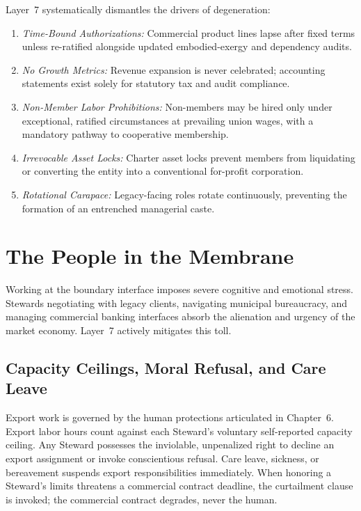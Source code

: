 Layer~7 systematically dismantles the drivers of degeneration:
\begin{enumerate}
  \item \textit{Time-Bound Authorizations:} Commercial product lines lapse after fixed terms unless re-ratified alongside updated embodied-exergy and dependency audits.
  \item \textit{No Growth Metrics:} Revenue expansion is never celebrated; accounting statements exist solely for statutory tax and audit compliance.
  \item \textit{Non-Member Labor Prohibitions:} Non-members may be hired only under exceptional, ratified circumstances at prevailing union wages, with a mandatory pathway to cooperative membership.
  \item \textit{Irrevocable Asset Locks:} Charter asset locks prevent members from liquidating or converting the entity into a conventional for-profit corporation.
  \item \textit{Rotational Carapace:} Legacy-facing roles rotate continuously, preventing the formation of an entrenched managerial caste.
\end{enumerate}

\section{The People in the Membrane}

Working at the boundary interface imposes severe cognitive and emotional stress. Stewards negotiating with legacy clients, navigating municipal bureaucracy, and managing commercial banking interfaces absorb the alienation and urgency of the market economy. Layer~7 actively mitigates this toll.

\subsection{Capacity Ceilings, Moral Refusal, and Care Leave}

Export work is governed by the human protections articulated in Chapter~6. Export labor hours count against each Steward's voluntary self-reported capacity ceiling. Any Steward possesses the inviolable, unpenalized right to decline an export assignment or invoke conscientious refusal. Care leave, sickness, or bereavement suspends export responsibilities immediately. When honoring a Steward's limits threatens a commercial contract deadline, the curtailment clause is invoked; the commercial contract degrades, never the human.

